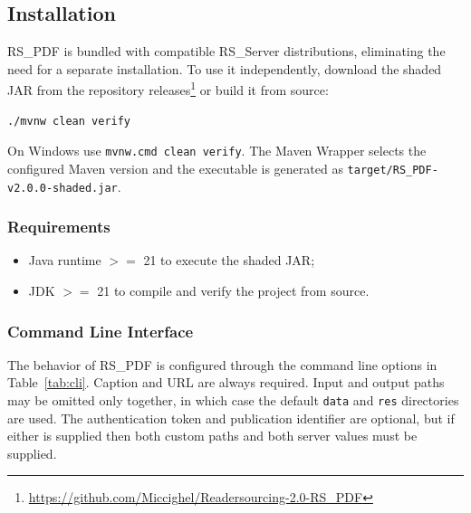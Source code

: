 \documentclass[a4paper, english]{article}
\newcommand{\rsserver}{RS\_Server\xspace}
\newcommand{\rspdf}{RS\_PDF\xspace}
\begin{document}
\subsection{Installation}

\rspdf is bundled with compatible \rsserver distributions, eliminating the need for a separate installation. To use it independently, download the shaded JAR from the repository releases\footnote{\url{https://github.com/Miccighel/Readersourcing-2.0-RS_PDF}} or build it from source:

\begin{lstlisting}
./mvnw clean verify
\end{lstlisting}

On Windows use \verb|mvnw.cmd clean verify|. The Maven Wrapper selects the configured Maven version and the executable is generated as \verb|target/RS_PDF-v2.0.0-shaded.jar|.

\subsubsection{Requirements}

\begin{itemize}
\item Java runtime $>=$ 21 to execute the shaded JAR;
\item JDK $>=$ 21 to compile and verify the project from source.
\end{itemize}

\subsubsection{Command Line Interface}

The behavior of \rspdf is configured through the command line options in Table~\ref{tab:cli}. Caption and URL are always required. Input and output paths may be omitted only together, in which case the default \verb|data| and \verb|res| directories are used. The authentication token and publication identifier are optional, but if either is supplied then both custom paths and both server values must be supplied.
\end{document}
